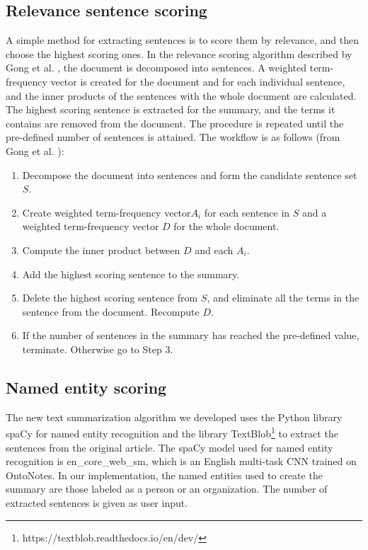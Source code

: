 \documentclass[conference]{IEEEtran}
\begin{document}
\subsection{Relevance sentence scoring}
A simple method for extracting sentences is to score them by relevance, and then choose the highest scoring ones. In the relevance scoring algorithm described by Gong et al. \cite{gong2001}, the document is decomposed into sentences. A weighted term-frequency vector is created for the document and for each individual sentence, and the inner products of the sentences with the whole document are calculated. The highest scoring sentence is extracted for the summary, and the terms it contains are removed from the document. The procedure is repeated until the pre-defined number of sentences is attained. The workflow is as follows (from Gong et al. \cite{gong2001}):
\begin{enumerate}
	\item Decompose the document into sentences and form the candidate sentence set $S$.
	\item Create weighted term-frequency vector$A_i$  for each sentence in $S$ and a weighted term-frequency vector $D$ for the whole document.
	\item Compute the inner product between $D$ and each $A_i$.
	\item Add the highest scoring sentence to the summary.
	\item Delete the highest scoring sentence from $S$, and eliminate all the terms in the sentence from the document. Recompute $D$.
	\item If the number of sentences in the summary has reached the pre-defined value, terminate. Otherwise go to Step 3.
\end{enumerate}

\subsection{Named entity scoring}
The new text summarization algorithm we developed uses the Python library spaCy for named entity recognition and the library TextBlob\footnote{https://textblob.readthedocs.io/en/dev/} to extract the sentences from the original article. 
The spaCy model used for named entity recognition is en\_core\_web\_sm, which is an English multi-task CNN trained on OntoNotes. %
In our implementation, the named entities used to create the summary are those labeled as a person or an organization. The number of extracted sentences is given as user input.
\end{document}
